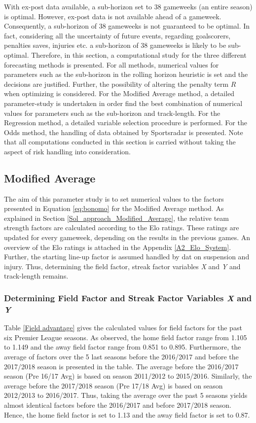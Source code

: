With ex-post data available, a sub-horizon set to 38 gameweeks (an entire season) is optimal. However, ex-post data is not available ahead of a gameweek. Consequently, a sub-horizon of 38 gameweeks is not guaranteed to be optimal. In fact, considering all the uncertainty of future events, regarding goalscorers, penalties saves, injuries etc. a sub-horizon of 38 gameweeks is likely to be sub-optimal. Therefore, in this section, a computational study for the three different forecasting methods is presented. For all methods, numerical values for parameters such as the sub-horizon in the rolling horizon heuristic is set and the decisions are justified. Further, the possibility of altering the penalty term $R$ when optimizing is considered. For the Modified Average method, a detailed parameter-study is undertaken in order find the best combination of numerical values for parameters such as the sub-horizon and track-length. For the Regression method, a detailed variable selection procedure is performed. For the Odds method, the handling of data obtained by Sportsradar is presented. Note that all computations conducted in this section is carried without taking the aspect of risk handling into consideration.

\subsection{Modified Average}\label{sec:comp_s_MA}

The aim of this parameter study is to set numerical values to the factors presented in Equation \ref{eq:bonomo} for the Modified Average method. As explained in Section \ref{Sol_approach_Modified_Average}, the relative team strength factors are calculated according to the Elo ratings. These ratings are updated for every gameweek, depending on the results in the previous games. An overview of the Elo ratings is attached in the Appendix \ref{A2_Elo_System}. Further, the starting line-up factor is assumed handled by dat on suspension and injury. Thus, determining the field factor, streak factor variables \textit{X} and \textit{Y} and track-length remains. 

\subsubsection{Determining Field Factor and Streak Factor Variables \textit{X} and \textit{Y}}

Table \ref{Field advantage} gives the calculated values for field factors for the past six Premier League seasons. As observed, the home field factor range from 1.105 to 1.149 and the away field factor range from 0.851 to 0.895. Furthermore, the average of factors over the 5 last seasons before the 2016/2017 and before the 2017/2018 season is presented in the table. The average before the 2016/2017 season (Pre 16/17 Avg) is based on season 2011/2012 to 2015/2016. Similarly, the average before the 2017/2018 season (Pre 17/18 Avg) is based on season 2012/2013 to 2016/2017. Thus, taking the average over the past 5 seasons yields almost identical factors before the 2016/2017 and before 2017/2018 season. Hence, the home field factor is set to 1.13 and the away field factor is set to 0.87. 


